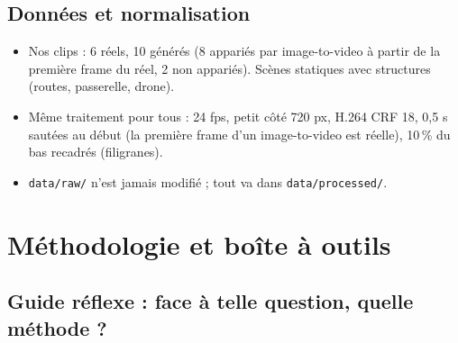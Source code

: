 \documentclass[11pt,a4paper]{article}
\begin{document}
\subsection{Données et normalisation}
\begin{itemize}
  \item Nos clips : 6 réels, 10 générés (8 appariés par image-to-video à partir de la première frame du
        réel, 2 non appariés). Scènes statiques avec structures (routes, passerelle, drone).
  \item Même traitement pour tous : 24 fps, petit côté 720 px, H.264 CRF 18, 0,5 s sautées au début
        (la première frame d'un image-to-video est réelle), 10\,\% du bas recadrés (filigranes).
  \item \texttt{data/raw/} n'est jamais modifié ; tout va dans \texttt{data/processed/}.
\end{itemize}

\section{Méthodologie et boîte à outils}

\subsection{Guide réflexe : face à telle question, quelle méthode ?}
\end{document}
